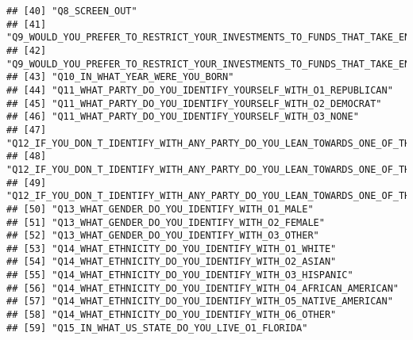 \documentclass[
]{article}
\begin{document}
\begin{verbatim}
## [40] "Q8_SCREEN_OUT"                                                                                                               
## [41] "Q9_WOULD_YOU_PREFER_TO_RESTRICT_YOUR_INVESTMENTS_TO_FUNDS_THAT_TAKE_ENVIRONMENTAL_SOCIAL_AND_GOVERNANCE_O1_YES"              
## [42] "Q9_WOULD_YOU_PREFER_TO_RESTRICT_YOUR_INVESTMENTS_TO_FUNDS_THAT_TAKE_ENVIRONMENTAL_SOCIAL_AND_GOVERNANCE_O2_NO"               
## [43] "Q10_IN_WHAT_YEAR_WERE_YOU_BORN"                                                                                              
## [44] "Q11_WHAT_PARTY_DO_YOU_IDENTIFY_YOURSELF_WITH_O1_REPUBLICAN"                                                                  
## [45] "Q11_WHAT_PARTY_DO_YOU_IDENTIFY_YOURSELF_WITH_O2_DEMOCRAT"                                                                    
## [46] "Q11_WHAT_PARTY_DO_YOU_IDENTIFY_YOURSELF_WITH_O3_NONE"                                                                        
## [47] "Q12_IF_YOU_DON_T_IDENTIFY_WITH_ANY_PARTY_DO_YOU_LEAN_TOWARDS_ONE_OF_THEM_O1_REPUBLICAN"                                      
## [48] "Q12_IF_YOU_DON_T_IDENTIFY_WITH_ANY_PARTY_DO_YOU_LEAN_TOWARDS_ONE_OF_THEM_O2_DEMOCRAT"                                        
## [49] "Q12_IF_YOU_DON_T_IDENTIFY_WITH_ANY_PARTY_DO_YOU_LEAN_TOWARDS_ONE_OF_THEM_O3_NONE"                                            
## [50] "Q13_WHAT_GENDER_DO_YOU_IDENTIFY_WITH_O1_MALE"                                                                                
## [51] "Q13_WHAT_GENDER_DO_YOU_IDENTIFY_WITH_O2_FEMALE"                                                                              
## [52] "Q13_WHAT_GENDER_DO_YOU_IDENTIFY_WITH_O3_OTHER"                                                                               
## [53] "Q14_WHAT_ETHNICITY_DO_YOU_IDENTIFY_WITH_O1_WHITE"                                                                            
## [54] "Q14_WHAT_ETHNICITY_DO_YOU_IDENTIFY_WITH_O2_ASIAN"                                                                            
## [55] "Q14_WHAT_ETHNICITY_DO_YOU_IDENTIFY_WITH_O3_HISPANIC"                                                                         
## [56] "Q14_WHAT_ETHNICITY_DO_YOU_IDENTIFY_WITH_O4_AFRICAN_AMERICAN"                                                                 
## [57] "Q14_WHAT_ETHNICITY_DO_YOU_IDENTIFY_WITH_O5_NATIVE_AMERICAN"                                                                  
## [58] "Q14_WHAT_ETHNICITY_DO_YOU_IDENTIFY_WITH_O6_OTHER"                                                                            
## [59] "Q15_IN_WHAT_US_STATE_DO_YOU_LIVE_O1_FLORIDA"                                                                                 

\end{verbatim}
\end{document}
